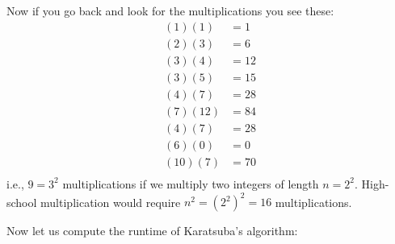 Now if you go back and look for the multiplications you see these:
\begin{align*}
(1)(1) &= 1\\
(2)(3) &= 6\\
(3)(4) &= 12\\
(3)(5) &= 15\\
(4)(7) &= 28\\
(7)(12) &= 84\\
(4)(7) &= 28\\
(6)(0) &= 0\\
(10)(7) &= 70\\
\end{align*}
i.e., $9 = 3^2$ multiplications if we multiply two 
integers of length $n = 2^2$.
High-school multiplication would require $n^2 = (2^2)^2 = 16$
multiplications.


Now let us compute the runtime of Karatsuba's algorithm:

